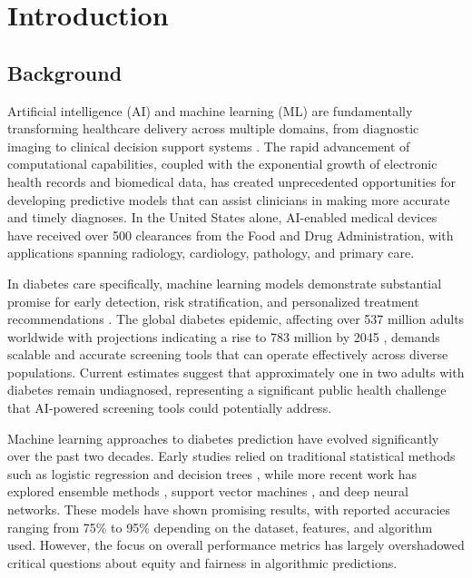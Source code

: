 
\section{Introduction}

\subsection{Background}

Artificial intelligence (AI) and machine learning (ML) are fundamentally 
transforming healthcare delivery across multiple domains, from diagnostic 
imaging to clinical decision support systems \cite{topol2019}. The rapid 
advancement of computational capabilities, coupled with the exponential 
growth of electronic health records and biomedical data, has created 
unprecedented opportunities for developing predictive models that can 
assist clinicians in making more accurate and timely diagnoses. In the 
United States alone, AI-enabled medical devices have received over 500 
clearances from the Food and Drug Administration, with applications 
spanning radiology, cardiology, pathology, and primary care.

In diabetes care specifically, machine learning models demonstrate 
substantial promise for early detection, risk stratification, and 
personalized treatment recommendations \cite{sd2019, esteva2017}. 
The global diabetes epidemic, affecting over 537 million adults worldwide 
with projections indicating a rise to 783 million by 2045 \cite{idf2021}, 
demands scalable and accurate screening tools that can operate effectively 
across diverse populations. Current estimates suggest that approximately 
one in two adults with diabetes remain undiagnosed, representing a 
significant public health challenge that AI-powered screening tools could 
potentially address.

Machine learning approaches to diabetes prediction have evolved 
significantly over the past two decades. Early studies relied on 
traditional statistical methods such as logistic regression and decision 
trees \cite{smith1988}, while more recent work has explored ensemble 
methods \cite{breiman2001, friedman2001}, support vector machines 
\cite{vapnik1995}, and deep neural networks. These models have shown 
promising results, with reported accuracies ranging from 75\% to 95\% 
depending on the dataset, features, and algorithm used. However, 
the focus on overall performance metrics has largely overshadowed 
critical questions about equity and fairness in algorithmic predictions.

